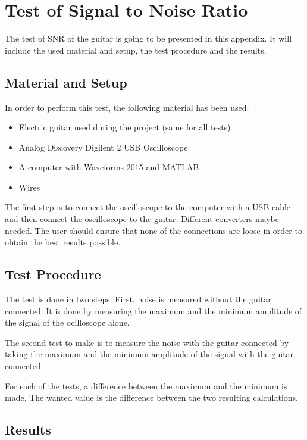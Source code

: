 \chapter{Test of Signal to Noise Ratio}

The test of SNR of the guitar is going to be presented in this appendix. It will include the used material and setup, the test procedure and the results. 

\section{Material and Setup}

In order to perform this test, the following material has been used:

\begin{itemize}
	\item Electric guitar used during the project (same for all tests)
	\item Analog Discovery Digilent 2 USB Oscilloscope
	\item A computer with Waveforms 2015 and MATLAB
	\item Wires
\end{itemize}


The first step is to connect the oscilloscope to the computer with a USB cable and then connect the oscilloscope to the guitar. Different converters maybe needed. The user should ensure that none of the connections are loose in order to obtain the best results possible. 

\section{Test Procedure}

The test is done in two steps. First, noise is measured without the guitar connected. It is done by measuring the maximum and the minimum amplitude of the signal of the ocilloscope alone.

The second test to make is to measure the noise with the guitar connected by taking the maximum and the minimum amplitude of the signal with the guitar connected. 

For each of the tests, a difference between the maximum and the minimum is made. The wanted value is the difference between the two resulting calculations. 

\section{Results}

